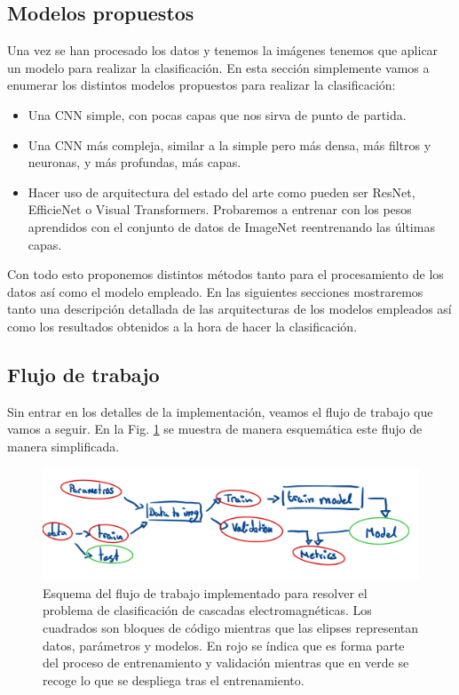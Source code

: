 \documentclass[a4paper,12pt,twoside,titlepage]{article}
\newcommand{\red}[1]{\textcolor{red}{#1}}
\begin{document}
\subsection{Modelos propuestos}

Una vez se han procesado los datos y tenemos la imágenes tenemos que aplicar un modelo para realizar la clasificación. En esta sección simplemente vamos a enumerar los distintos modelos propuestos para realizar la clasificación:

\begin{itemize}
  \item Una CNN simple, con pocas capas que nos sirva de punto de partida.
  \item Una CNN más compleja, similar a la simple pero más densa, más filtros y neuronas, y más profundas, más capas.
  \item Hacer uso de arquitectura del estado del arte como pueden ser ResNet, EfficieNet o Visual Transformers. Probaremos a entrenar con los pesos aprendidos con el conjunto de datos de ImageNet reentrenando las últimas capas.
\end{itemize}

Con todo esto proponemos distintos métodos tanto para el procesamiento de los datos así como el modelo empleado. En las siguientes secciones mostraremos tanto una descripción detallada de las arquitecturas de los modelos empleados así como los resultados obtenidos a la hora de hacer la clasificación.

\subsection{Flujo de trabajo}

Sin entrar en los detalles de la implementación, veamos el flujo de trabajo que vamos a seguir. En la Fig. \ref{fig:flujo} se muestra de manera esquemática este flujo de manera simplificada.

\begin{figure}[h!]
  \centering
  \includegraphics[scale=0.49]{flujo_tem.PNG}
  \caption{Esquema del flujo de trabajo implementado para resolver el problema de clasificación de cascadas electromagnéticas. Los cuadrados son bloques de código mientras que las elipses representan datos, parámetros y modelos. En rojo se índica que es forma parte del proceso de entrenamiento y validación mientras que en verde se recoge lo que se despliega tras el entrenamiento.}
  \label{fig:flujo}
\end{figure}
\end{document}
